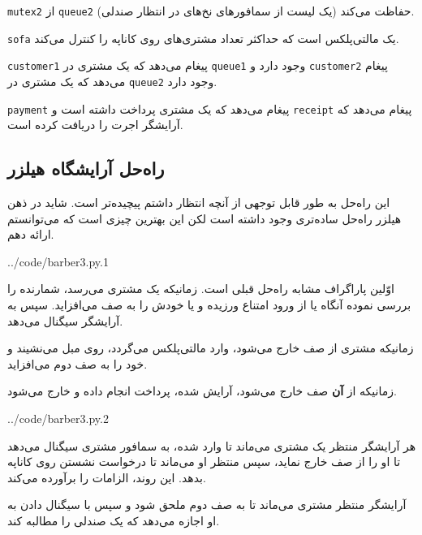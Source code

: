 \documentclass{book}
\newcommand{\clearemptydoublepage}{}%
\begin{document}
    {\tt mutex2} 
    از {\tt queue2} (یک لیست از سمافورهای نخ‌های در انتظار صندلی) حفاظت می‌کند. 

    {\tt sofa} 
    یک مالتی‌پلکس است که حداکثر تعداد مشتری‌های روی کاناپه را کنترل می‌کند.

    {\tt customer1}
    پیغام می‌دهد که یک مشتری در  {\tt queue1} وجود دارد و {\tt customer2} پیغام می‌دهد که یک مشتری در  {\tt queue2} وجود دارد. 

     {\tt payment}
    پیغام می‌دهد که یک مشتری پرداخت داشته است و {\tt receipt} پیغام می‌دهد که آرایشگر اجرت را دریافت کرده است. 


\clearemptydoublepage
\subsection {راه‌حل آرایشگاه هیلزر}

    این راه‌حل به طور قابل توجهی از آنچه انتظار داشتم پیچیده‌تر است. شاید در ذهن هیلزر راه‌حل ساده‌تری وجود داشته است لکن 
    این بهترین چیزی است که می‌توانستم ارائه دهم. 

\begin{latin}

{../code/barber3.py.1}
\end{latin}

    اوّلین پاراگراف مشابه راه‌حل قبلی است. زمانیکه یک مشتری می‌رسد، شمارنده را بررسی نموده آنگاه یا از ورود امتناع ورزیده و یا خودش را به 
    صف می‌افزاید. سپس به آرایشگر سیگنال می‌دهد. 

    زمانیکه مشتری از صف خارج می‌شود، وارد مالتی‌پلکس می‌گردد، روی مبل می‌نشیند و خود را به صف دوم می‌افزاید. 

    زمانیکه از \textbf{آن} صف خارج می‌شود، آرایش شده، پرداخت انجام داده و خارج می‌شود.

\begin{latin}

{../code/barber3.py.2}
\end{latin}


    هر آرایشگر منتظر یک مشتری می‌ماند تا وارد شده، به سمافور مشتری سیگنال می‌دهد تا او را از صف خارج نماید، سپس منتظر او می‌ماند 
    تا درخواست نشستن روی کاناپه بدهد. این روند، الزامات  را برآورده می‌کند.

    آرایشگر منتظر مشتری می‌ماند تا به صف دوم ملحق شود و سپس با سیگنال دادن به او اجازه می‌دهد که یک صندلی را مطالبه کند. 
\end{document}
